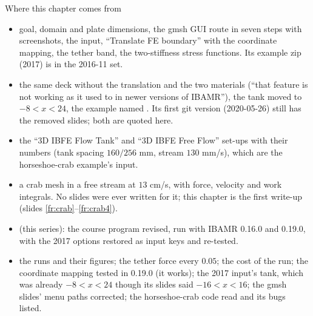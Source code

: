 \documentclass[aspectratio=169,11pt]{beamer}
\begin{document}
\begin{frame}{Where this chapter comes from}
\label{fr:sources}
\scriptsize
\begin{itemize}
  \item {} goal, domain and plate dimensions, the gmsh GUI route in seven steps with screenshots, the input, ``Translate FE boundary'' with the coordinate mapping, the tether band, the two-stiffness stress functions. Its example zip  (2017) is in the 2016-11 set.
  \item {} the same deck without the translation and the two materials (``that feature is not working as it used to in newer versions of IBAMR''), the tank moved to $-8 < x < 24$, the example named . Its first git version (2020-05-26) still has the removed slides; both are quoted here.
  \item {} the ``3D IBFE Flow Tank'' and ``3D IBFE Free Flow'' set-ups with their numbers (tank spacing $160/256$ mm, stream $130$ mm/s), which are the horseshoe-crab example's input.
  \item {} a crab mesh in a free stream at $13$ cm/s, with force, velocity and work integrals. No slides were ever written for it; this chapter is the first write-up (slides \ref{fr:crab}--\ref{fr:crab4}).
  \item {} (this series): the course program revised, run with IBAMR 0.16.0 and 0.19.0, with the 2017 options restored as input keys and re-tested.
  \item {} the runs and their figures; the tether force every $0.05$; the cost of the run; the coordinate mapping tested in 0.19.0 (it works); the 2017 input's tank, which was already $-8 < x < 24$ though its slides said $-16 < x < 16$; the gmsh slides' menu paths corrected; the horseshoe-crab code read and its bugs listed.
\end{itemize}
\end{frame}
\end{document}
